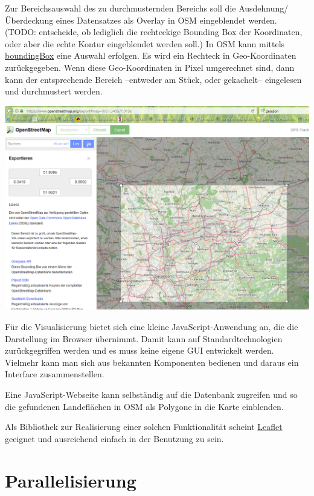 \documentclass[
11pt, %
a4paper, %
oneside, %
pdfspacing, %
headinclude,
BCOR5mm, %
ngerman, %
bibtotocnumbered,
]{scrartcl}
\begin{document}
Zur Bereichsauswahl des zu durchmusternden Bereichs soll die Ausdehnung/Überdeckung eines Datensatzes als Overlay in OSM eingeblendet werden. (TODO: entscheide, ob lediglich die rechteckige Bounding Box der Koordinaten, oder aber die echte Kontur eingeblendet werden soll.)
In OSM kann mittels \href{http://wiki.openstreetmap.org/wiki/Bounding_Box}{boundingBox} eine Auswahl erfolgen. Es wird ein Rechteck in Geo-Koordinaten zurückgegeben. Wenn diese Geo-Koordinaten in Pixel umgerechnet sind, dann kann der entsprechende Bereich –entweder am Stück, oder gekachelt– eingelesen und durchmustert werden. 

\includegraphics[width=\textwidth]{./drawings/AuswahlKartenausschnitt.png}

Für die Visualisierung bietet sich eine kleine JavaScript-Anwendung an, die die Darstellung im Browser übernimmt. Damit kann auf Standardtechnologien zurückgegriffen werden und es muss keine eigene GUI entwickelt werden. Vielmehr kann man sich aus bekannten Komponenten bedienen und daraus ein Interface zusammenstellen.
 
Eine JavaScript-Webseite kann selbständig auf die Datenbank zugreifen und so die gefundenen Landeflächen in OSM als Polygone in die Karte einblenden. 

Als Bibliothek zur Realisierung einer solchen Funktionalität scheint \href{http://leafletjs.com/examples.html }{Leaflet} geeignet und ausreichend einfach in der Benutzung zu sein.





\section{Parallelisierung}
\end{document}
